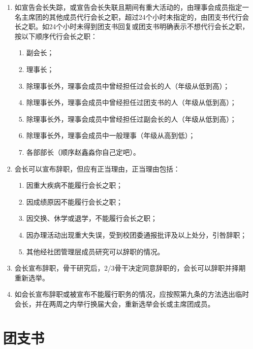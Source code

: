 \begin{enumerate}[resume]
    \item 如宣告会长失踪，或宣告会长失联且期间有重大活动的，由理事会成员指定一名主席团的其他成员代行会长之职，超过24个小时未指定的，由团支书代行会长之职。如24个小时未得到团支书回复或团支书明确表示不想代行会长之职，按以下顺序代行会长之职：
    
    \begin{enumerate}
        \item 副会长；
        \item 理事长；
        \item 除理事长外，理事会成员中曾经担任过会长的人（年级从低到高）；
        \item 除理事长外，理事会成员中曾经担任过团支书的人（年级从低到高）；
        \item 除理事长外，理事会成员中曾经担任过副会长的人（年级从低到高）；
        \item 除理事长外，理事会成员中一般理事（年级从高到低）；
        \item 各部部长（顺序赵鑫淼你自己定吧）。
    \end{enumerate}
    
    \item 会长可以宣布辞职，但应有正当理由，正当理由包括：
    
    \begin{enumerate}
        \item 因重大疾病不能履行会长之职；
        \item 因成绩原因不能履行会长之职；
        \item 因交换、休学或退学，不能履行会长之职；
        \item 因办理活动出现重大失误，受到校团委通报批评及以上处分，引咎辞职；
        \item 其他经社团管理层成员研究可以辞职的情况。
    \end{enumerate}

    \item 会长宣布辞职，骨干研究后，2/3骨干决定同意辞职的，会长可以辞职并择期重新选举。
    
    \item 如会长宣布辞职或被宣布不能履行职务的情况，应按照第九条的方法选出临时会长，并在两周之内举行换届大会，重新选举会长或主席团成员。
\end{enumerate}

\section{团支书}


